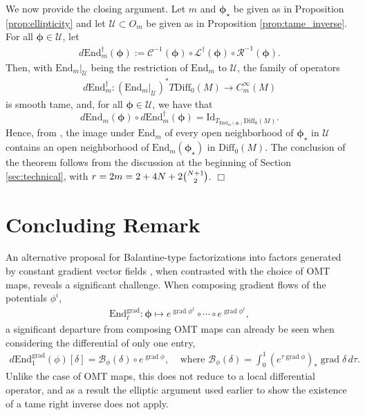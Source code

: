 \documentclass{article}
\theoremstyle{remark}
\newcommand{\M}{M}
\newcommand{\CinfV}[1]{C_{#1}^{\infty}(\M)}
\newcommand{\Diff}{\mathrm{Diff}_0(\M)}
\DeclareMathOperator{\grad}{\mathrm{grad}}
\begin{document}
%
We now provide the closing argument. Let $m$ and $\bm{\phi}_{\star}$ be given as in Proposition \ref{prop:ellipticity} and let $\mathcal{U}\subset O_m$ be given as in Proposition \ref{prop:tame_inverse}. For all $\bm{\phi}\in \mathcal{U}$, let
%
\begin{align*}
    d\mathrm{End}_{m}^\dagger(\bm{\phi}):= \mathcal{C}^{-1}(\bm{\phi})\circ \mathcal{L}^\dagger(\bm{\phi})\circ \mathcal{R}^{-1}(\bm{\phi}).
\end{align*}
%
Then, with $\mathrm{End}_{m}|_{\mathcal{U}}$ being the restriction of $\mathrm{End}_{m}$ to $\mathcal{U}$, the family of operators
%
\begin{align*}
    d\mathrm{End}_{m}^\dagger: (\mathrm{End}_{m}|_{\mathcal{U}})^*T\Diff \rightarrow \CinfV{m}
\end{align*}
%
is smooth tame, and, for all $\bm{\phi}\in \mathcal{U}$, we have that 
\[
d\mathrm{End}_{m}(\bm{\phi})\circ d\mathrm{End}_{m}^\dagger(\bm{\phi})=\mathrm{Id}_{T_{\mathrm{End}_{m}(\bm{\phi})}\Diff}.
\]
Hence, from \cite[Part~III, Theorem 1.1.3]{Hamilton1982}, the image under $\mathrm{End}_{m}$ of every open neighborhood of $\bm{\phi}_\star$ in $\mathcal{U}$ contains an open neighborhood of $\mathrm{End}_{m}(\bm{\phi}_\star)$ in $\Diff$. The conclusion of the theorem follows from the discussion at the beginning of Section \ref{sec:technical}, with $r=2m=2+4N+2\tbinom{N+1}{2}$. \hfill $\Box$
%

\section{Concluding Remark}
An alternative proposal for Balantine-type factorizations into factors generated by constant gradient vector fields \cite{abdelgalil2026holonomy}, when contrasted with the choice of OMT maps, reveals a significant challenge. When composing gradient flows of the potentials $\phi^i$,
\begin{align*}
    \mathrm{End}_{\ell}^{\grad}:\bm{\phi}\mapsto e^{\grad\phi^1}\circ\cdots \circ e^{\grad\phi^\ell},
\end{align*}
a significant departure from composing OMT maps can already be seen when considering the differential of only one entry,
\begin{align*}
    d\mathrm{End}_{1}^{\grad}(\phi)[\delta] = 
    \mathcal B_\phi(\delta) \circ e^{\grad\phi}, &  \mbox{ where }    \mathcal B_\phi(\delta) =\int_0^1 (e^{\tau \grad\phi})_*\grad \delta\, d\tau.
\end{align*}
Unlike the case of OMT maps, this does not reduce to a local differential operator, and as a result the elliptic argument used earlier to show the existence of a tame right inverse does not apply. 





\end{document}
